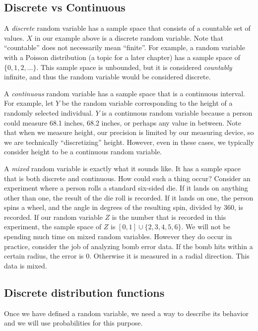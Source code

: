 \documentclass[
  letterpaper,
  DIV=11,
  numbers=noendperiod]{scrreprt}
\begin{document}
\subsection{Discrete vs Continuous}\label{discrete-vs-continuous}

A \emph{discrete} random variable has a sample space that consists of a
countable set of values. \(X\) in our example above is a discrete random
variable. Note that ``countable'' does not necessarily mean ``finite''.
For example, a random variable with a Poisson distribution (a topic for
a later chapter) has a sample space of \(\{0,1,2,...\}\). This sample
space is unbounded, but it is considered \emph{countably} infinite, and
thus the random variable would be considered discrete.

A \emph{continuous} random variable has a sample space that is a
continuous interval. For example, let \(Y\) be the random variable
corresponding to the height of a randomly selected individual. \(Y\) is
a continuous random variable because a person could measure 68.1 inches,
68.2 inches, or perhaps any value in between. Note that when we measure
height, our precision is limited by our measuring device, so we are
technically ``discretizing'' height. However, even in these cases, we
typically consider height to be a continuous random variable.

A \emph{mixed} random variable is exactly what it sounds like. It has a
sample space that is both discrete and continuous. How could such a
thing occur? Consider an experiment where a person rolls a standard
six-sided die. If it lands on anything other than one, the result of the
die roll is recorded. If it lands on one, the person spins a wheel, and
the angle in degrees of the resulting spin, divided by 360, is recorded.
If our random variable \(Z\) is the number that is recorded in this
experiment, the sample space of \(Z\) is \([0,1] \cup \{2,3,4,5,6\}\).
We will not be spending much time on mixed random variables. However
they do occur in practice, consider the job of analyzing bomb error
data. If the bomb hits within a certain radius, the error is 0.
Otherwise it is measured in a radial direction. This data is mixed.

\subsection{Discrete distribution
functions}\label{discrete-distribution-functions}

Once we have defined a random variable, we need a way to describe its
behavior and we will use probabilities for this purpose.
\end{document}
